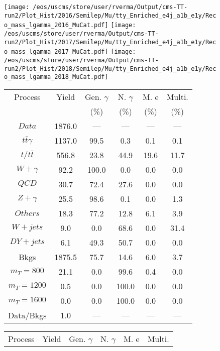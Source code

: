\begin{figure}
\centering
\texttt{[image: /eos/uscms/store/user/rverma/Output/cms-TT-run2/Plot\_Hist/2016/Semilep/Mu/tty\_Enriched\_e4j\_a1b\_e1y/Reco\_mass\_lgamma\_2016\_MuCat.pdf]}
\texttt{[image: /eos/uscms/store/user/rverma/Output/cms-TT-run2/Plot\_Hist/2017/Semilep/Mu/tty\_Enriched\_e4j\_a1b\_e1y/Reco\_mass\_lgamma\_2017\_MuCat.pdf]}
\texttt{[image: /eos/uscms/store/user/rverma/Output/cms-TT-run2/Plot\_Hist/2018/Semilep/Mu/tty\_Enriched\_e4j\_a1b\_e1y/Reco\_mass\_lgamma\_2018\_MuCat.pdf]}
\begin{minipage}[c]{0.32\textwidth}
\centering
\tiny{
\begin{tabular}{cccccc}
\hline
Process & Yield & Gen. $\gamma$ & N. $\gamma$ & M. e & Multi. \\
 &  & (\%) & (\%) & (\%) & (\%)  \\
\hline
                                                                      $ Data $ &  1876.0 &  --- &  --- &  --- &  ---\\
$ t\bar{t}\gamma $ &  1137.0 &  99.5 &  0.3 &  0.1 &  0.1\\
$ t/t\bar{t} $ &  556.8 &  23.8 &  44.9 &  19.6 &  11.7\\
$ W+\gamma $ &  92.2 &  100.0 &  0.0 &  0.0 &  0.0\\
$ QCD $ &  30.7 &  72.4 &  27.6 &  0.0 &  0.0\\
$ Z+\gamma $ &  25.5 &  98.6 &  0.1 &  0.0 &  1.3\\
$ Others $ &  18.3 &  77.2 &  12.8 &  6.1 &  3.9\\
$ W+jets $ &  9.0 &  0.0 &  68.6 &  0.0 &  31.4\\
$ DY+jets $ &  6.1 &  49.3 &  50.7 &  0.0 &  0.0\\
Bkgs &  1875.5 &  75.7 &  14.6 &  6.0 &  3.7\\
$ m_{T} = 800 $ &  21.1 &  0.0 &  99.6 &  0.4 &  0.0\\
$ m_{T} = 1200 $ &  0.5 &  0.0 &  100.0 &  0.0 &  0.0\\
$ m_{T} = 1600 $ &  0.0 &  0.0 &  100.0 &  0.0 &  0.0\\
Data/Bkgs &  1.0 &  --- &  --- &  --- &  ---\\
\hline
\end{tabular}
}
\end{minipage}
\begin{minipage}[c]{0.32\textwidth}
\centering
\tiny{
\begin{tabular}{cccccc}
\hline
Process & Yield & Gen. $\gamma$ & N. $\gamma$ & M. e & Multi. \\

\end{tabular}}
\end{minipage}
\end{figure}
